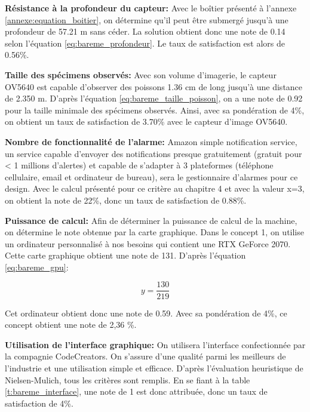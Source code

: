 \textbf{Résistance à la profondeur du capteur:} Avec le boîtier présenté à l'annexe \ref{annexe:equation_boitier}, on détermine qu'il peut être submergé jusqu'à une profondeur de 57.21 m sans céder. La solution obtient donc une note de 0.14 selon l'équation \ref{eq:bareme_profondeur}. Le taux de satisfaction est alors de 0.56\%.
\vspace{5mm}

\textbf{Taille des spécimens observés:}
Avec son volume d'imagerie, le capteur OV5640 est capable d'observer des poissons 1.36 cm de long jusqu'à une distance de 2.350 m. D'après l'équation \ref{eq:bareme_taille_poisson}, on a une note de 0.92 pour la taille minimale des spécimens observés. Ainsi, avec sa pondération de 4\%, on obtient un taux de satisfaction de 3.70\% avec le capteur d'image OV5640.
\vspace{5mm}

\textbf{Nombre de fonctionnalité de l'alarme:} Amazon simple notification service, un service capable d'envoyer des notifications presque gratuitement (gratuit pour < 1 millions d'alertes) et capable de s'adapter à 3 plateformes (téléphone cellulaire, email et ordinateur de bureau), sera le gestionnaire d'alarmes pour ce design. Avec le calcul présenté pour ce critère au chapitre 4 et avec la valeur x=3, on obtient la note de 22\%, donc un taux de satisfaction de 0.88\%.
\vspace{5mm}

\textbf{Puissance de calcul:} Afin de déterminer la puissance de calcul de la machine, on détermine le note obtenue par la carte graphique. Dans le concept 1, on utilise un ordinateur personnalisé à nos besoins qui contient une RTX GeForce 2070. Cette carte graphique obtient une note de 131. D'après l'équation \ref{eq:bareme_gpu}:

\begin{equation}
    y = \frac{130}{219}
\end{equation}

Cet ordinateur obtient donc une note de 0.59. Avec sa pondération de 4\%, ce concept obtient une note de 2,36 \%.
\vspace{5mm}


\textbf{Utilisation de l’interface graphique:}
On utilisera l’interface confectionnée par la compagnie CodeCreators. On s’assure d’une qualité parmi les meilleurs de l’industrie et une utilisation simple et efficace. D’après l'évaluation heuristique de Nielsen-Mulich, tous les critères sont remplis. En se fiant à la table \ref{t:bareme_interface}, une note de 1 est donc attribuée, donc un taux de satisfaction de 4\%.


